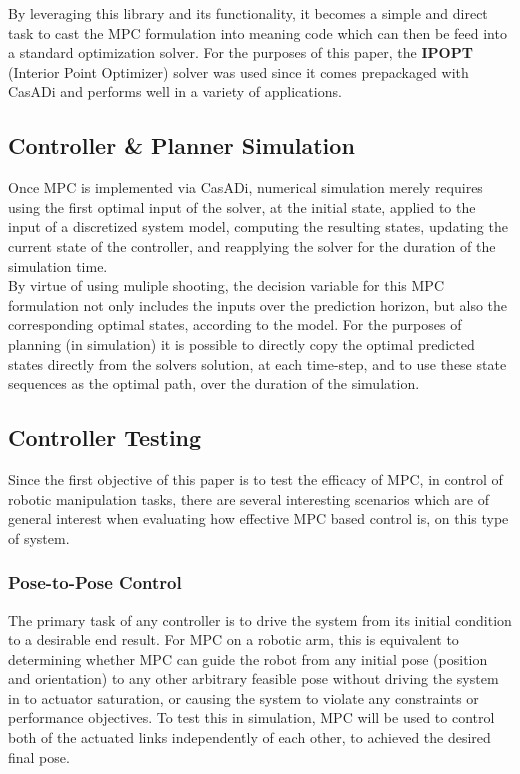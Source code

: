 \documentclass[journal]{IEEEtran}
\begin{document}
By leveraging this library and its functionality, it becomes a simple and direct task to cast the MPC formulation into meaning code which can then be feed into a standard optimization solver. For the purposes of this paper, the \textbf{IPOPT} (Interior Point Optimizer) solver was used since it comes prepackaged with CasADi and performs well in a variety of applications.

\subsection{Controller \& Planner Simulation}

Once MPC is implemented via CasADi, numerical simulation merely requires using the first optimal input of the solver, at the initial state, applied to the input of a discretized system model, computing the resulting states, updating the current state of the controller, and reapplying the solver for the duration of the simulation time.\\

By virtue of using muliple shooting, the decision variable for this MPC formulation not only includes the inputs over the prediction horizon, but also the corresponding optimal states, according to the model. For the purposes of planning (in simulation) it is possible to directly copy the optimal predicted states directly from the solvers solution, at each time-step, and to use these state sequences as the optimal path, over the duration of the simulation.

\subsection{Controller Testing}

Since the first objective of this paper is to test the efficacy of MPC, in control of robotic manipulation tasks, there are several interesting scenarios which are of general interest when evaluating how effective MPC based control is, on this type of system. \\

\subsubsection{Pose-to-Pose Control}
The primary task of any controller is to drive the system from its initial condition to a desirable end result. For MPC on a robotic arm, this is equivalent to determining whether MPC can guide the robot from any initial pose (position and orientation) to any other arbitrary feasible pose without driving the system in to actuator saturation, or causing the system to violate any constraints or performance objectives. To test this in simulation, MPC will be used to control both of the actuated links independently of each other, to achieved the desired final pose.\\
\end{document}
